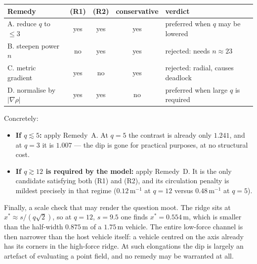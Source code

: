 \documentclass[11pt]{article}
\begin{document}
\begin{center}
\begin{tabular}{lcccl}
\toprule
Remedy & (R1) & (R2) & conservative & verdict\\
\midrule
A. reduce $q$ to $\le3$        & yes & yes & yes & preferred when $q$ may be lowered\\
B. steepen power $n$           & no  & yes & yes & rejected: needs $n\approx23$\\
C. metric gradient             & yes & no  & yes & rejected: radial, causes deadlock\\
D. normalise by $|\nabla\rho|$ & yes & yes & no  & preferred when large $q$ is required\\
\bottomrule
\end{tabular}
\end{center}

\noindent
Concretely:
\begin{itemize}
  \item \textbf{If $q\lesssim5$:} apply Remedy~A. At $q=5$ the contrast is
        already only $1.241$, and at $q=3$ it is $1.007$ --- the dip is gone
        for practical purposes, at no structural cost.
  \item \textbf{If $q\gtrsim12$ is required by the model:} apply Remedy~D. It
        is the only candidate satisfying both (R1) and (R2), and its
        circulation penalty is mildest precisely in that regime
        ($0.12\,$m$^{-1}$ at $q=12$ versus $0.48\,$m$^{-1}$ at $q=5$).
\end{itemize}

\noindent
Finally, a scale check that may render the question moot. The ridge sits at
$x^{*}\approx s/(q\sqrt2)$, so at $q=12$, $s=9.5$ one finds $x^{*}=0.554$\,m,
which is smaller than the half-width $0.875$\,m of a $1.75$\,m vehicle. The
entire low-force channel is then narrower than the host vehicle itself: a
vehicle centred on the axis already has its corners in the high-force ridge.
At such elongations the dip is largely an artefact of evaluating a point
field, and no remedy may be warranted at all.
\end{document}
